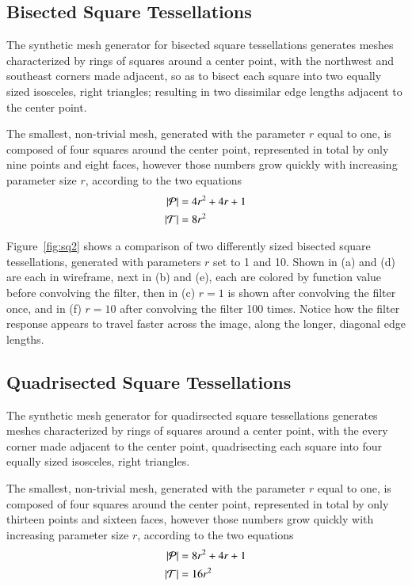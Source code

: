 %
%
%
%
\pagebreak
\subsection{Bisected Square Tessellations}
\label{ch6sSTDDssBST}
The synthetic mesh generator for bisected square tessellations generates meshes characterized by rings of squares around a center point, with the northwest and southeast corners made adjacent, so as to bisect each square into two equally sized isosceles, right triangles; resulting in two dissimilar edge lengths adjacent to the center point.

The smallest, non-trivial mesh, generated with the parameter $r$ equal to one, is composed of four squares around the center point, represented in total by only nine points and eight faces, however those numbers grow quickly with increasing parameter size $r$, according to the two equations
\begin{align}
	|\mathcal{P}| &= 4r^2 + 4r + 1 \\
	|\mathcal{T}| &= 8r^2
	\label{eq:sq2PointAndFaceCounts}
\end{align}

Figure~\ref{fig:sq2} shows a comparison of two differently sized bisected square tessellations, generated with parameters $r$ set to 1 and 10. Shown in (a) and (d) are each in wireframe, next in (b) and (e), each are colored by function value before convolving the filter, then in (c) $r=1$ is shown after convolving the filter once, and in (f) $r=10$ after convolving the filter 100 times. Notice how the filter response appears to travel faster across the image, along the longer, diagonal edge lengths.



%
%
%
%
\pagebreak
\subsection{Quadrisected Square Tessellations}
\label{ch6sSTDDssQST}
The synthetic mesh generator for quadirsected square tessellations generates meshes characterized by rings of squares around a center point, with the every corner made adjacent to the center point, quadrisecting each square into four equally sized isosceles, right triangles.

The smallest, non-trivial mesh, generated with the parameter $r$ equal to one, is composed of four squares around the center point, represented in total by only thirteen points and sixteen faces, however those numbers grow quickly with increasing parameter size $r$, according to the two equations
\begin{align}
	|\mathcal{P}| &= 8r^2 + 4r + 1 \\
	|\mathcal{T}| &= 16r^2
	\label{eq:sq4PointAndFaceCounts}
\end{align}

